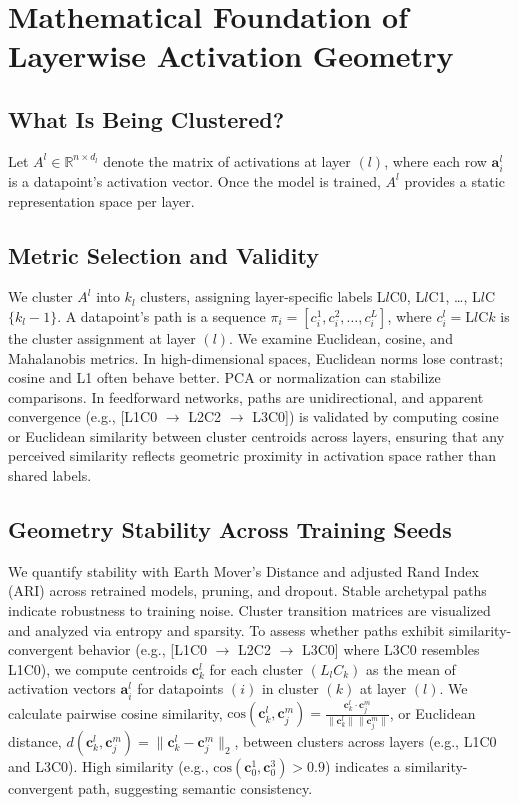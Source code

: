 \section{Mathematical Foundation of Layerwise Activation Geometry}

\subsection{What Is Being Clustered?}

Let $A^l \in \mathbb{R}^{n \times d_l}$ denote the matrix of activations at layer $(l)$, where each row $\mathbf{a}_i^l$ is a datapoint's activation vector. Once the model is trained, $A^l$ provides a static representation space per layer.

\subsection{Metric Selection and Validity}

We cluster $A^l$ into $k_l$ clusters, assigning layer-specific labels L$l$C0, L$l$C1, \dots, L$l$C$\{k_l-1\}$. A datapoint's path is a sequence $\pi_i = [c_i^1, c_i^2, \dots, c_i^L]$, where $c_i^l = \text{L}l\text{C}k$ is the cluster assignment at layer $(l)$. We examine Euclidean, cosine, and Mahalanobis metrics. In high-dimensional spaces, Euclidean norms lose contrast; cosine and L1 often behave better. PCA or normalization can stabilize comparisons. In feedforward networks, paths are unidirectional, and apparent convergence (e.g., [L1C0 $\rightarrow$ L2C2 $\rightarrow$ L3C0]) is validated by computing cosine or Euclidean similarity between cluster centroids across layers, ensuring that any perceived similarity reflects geometric proximity in activation space rather than shared labels.

\subsection{Geometry Stability Across Training Seeds}

We quantify stability with Earth Mover's Distance and adjusted Rand Index (ARI) across retrained models, pruning, and dropout. Stable archetypal paths indicate robustness to training noise. Cluster transition matrices are visualized and analyzed via entropy and sparsity. To assess whether paths exhibit similarity-convergent behavior (e.g., [L1C0 $\rightarrow$ L2C2 $\rightarrow$ L3C0] where L3C0 resembles L1C0), we compute centroids $\mathbf{c}_k^l$ for each cluster $(L_lC_k)$ as the mean of activation vectors $\mathbf{a}_i^l$ for datapoints $(i)$ in cluster $(k)$ at layer $(l)$. We calculate pairwise cosine similarity, $\text{cos}(\mathbf{c}_k^l, \mathbf{c}_j^m) = \frac{\mathbf{c}_k^l \cdot \mathbf{c}_j^m}{\|\mathbf{c}_k^l\| \|\mathbf{c}_j^m\|}$, or Euclidean distance, $d(\mathbf{c}_k^l, \mathbf{c}_j^m) = \|\mathbf{c}_k^l - \mathbf{c}_j^m\|_2$, between clusters across layers (e.g., L1C0 and L3C0). High similarity (e.g., $\text{cos}(\mathbf{c}_0^1, \mathbf{c}_0^3) > 0.9$) indicates a similarity-convergent path, suggesting semantic consistency.

